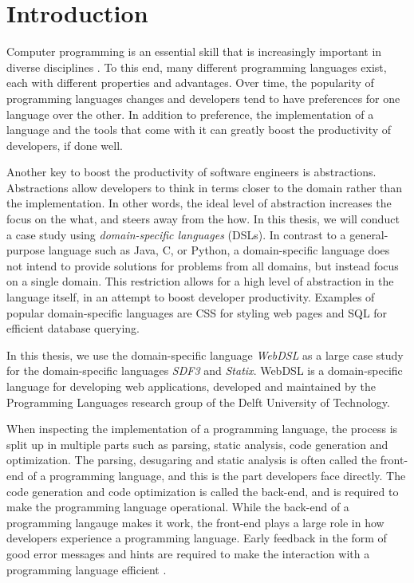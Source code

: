 
\chapter{\label{chap:introduction}Introduction}

  Computer programming is an essential skill that is increasingly important in diverse disciplines \autocite{Rafalski2019}. To this end, many different programming languages exist, each with different properties and advantages. Over time, the popularity of programming languages changes and developers tend to have preferences for one language over the other. In addition to preference, the implementation of a language and the tools that come with it can greatly boost the productivity of developers, if done well.

  Another key to boost the productivity of software engineers is abstractions. Abstractions allow developers to think in terms closer to the domain rather than the implementation. In other words, the ideal level of abstraction increases the focus on the what, and steers away from the how. In this thesis, we will conduct a case study using \textit{domain-specific languages} (DSLs). In contrast to a general-purpose language such as Java, C, or Python, a domain-specific language does not intend to provide solutions for problems from all domains, but instead focus on a single domain. This restriction allows for a high level of abstraction in the language itself, in an attempt to boost developer productivity. Examples of popular domain-specific languages are CSS for styling web pages and SQL for efficient database querying.

  In this thesis, we use the domain-specific language \textit{WebDSL} as a large case study for the domain-specific languages \textit{SDF3} and \textit{Statix}. WebDSL is a domain-specific language for developing web applications, developed and maintained by the Programming Languages research group of the Delft University of Technology.

  When inspecting the implementation of a programming language, the process is split up in multiple parts such as parsing, static analysis, code generation and optimization. The parsing, desugaring and static analysis is often called the front-end of a programming language, and this is the part developers face directly. The code generation and code optimization is called the back-end, and is required to make the programming language operational. While the back-end of a programming langauge makes it work, the front-end plays a large role in how developers experience a programming language. Early feedback in the form of good error messages and hints are required to make the interaction with a programming language efficient \autocite{Becker2019}.

